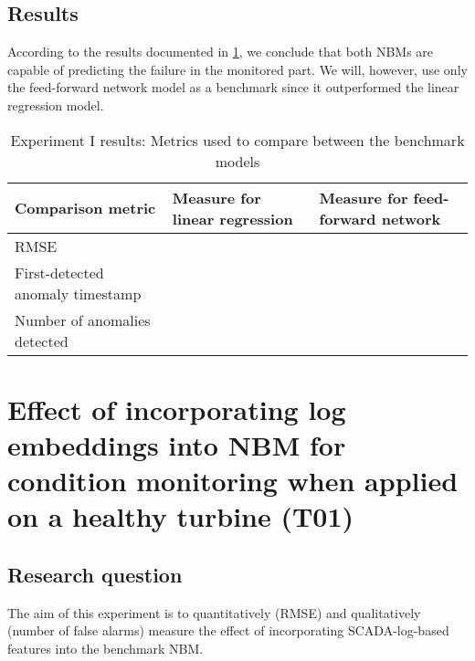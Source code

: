 \subsection{Results}
According to the results documented in \ref{tab:Experiment I results}, we conclude that both NBMs are capable of predicting the failure in the monitored part. We will, however, use only the feed-forward network model as a benchmark since it outperformed the linear regression model.
\begin{table}[H]
        \centering
    \begin{tabular}{|m{4cm}|m{4cm}|m{4cm}|}
    \hline
         \textbf{Comparison metric} & \textbf{Measure for linear regression}   & \textbf{Measure for feed-forward network}\\
         \hline
         RMSE & & \\
         \hline
         First-detected anomaly timestamp & & \\
         \hline
         Number of anomalies detected & & \\
         \hline
    \hline
    \end{tabular}
    \caption{Experiment I results: Metrics used to compare between the benchmark models}
        \label{tab:Experiment I results}
\end{table}


\section{Effect of incorporating log embeddings into NBM for condition monitoring when applied on a healthy turbine (T01)}

\subsection{Research question}
The aim of this experiment is to quantitatively (RMSE) and qualitatively (number of false alarms) measure the effect of incorporating SCADA-log-based features into the benchmark NBM.

